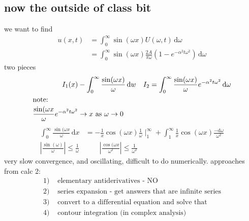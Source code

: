 \documentclass{article}
\begin{document}
\subsection*{now the outside of class bit}
we want to find
\begin{align*}
  u(x,t)&=\int_0^\infty{\sin(\omega x)U(\omega ,t)\,\mathrm{d}\omega }\\
  &=\int_0^\infty{\sin(\omega x)\frac{2A}{\pi \omega }\left(1-e^{-\alpha ^2t\omega ^2}\right)\,\mathrm{d}\omega }
\end{align*}
two pieces
\begin{align*}
  I_1(x)&-\int_0^\infty{\frac{\sin(\omega x)}{\omega }\,\mathrm{d}w}&I_2&=\int_0^\infty{\frac{\sin(\omega x)}{\omega }e^{-\alpha ^2t\omega ^2}\,\mathrm{d}\omega }\\
  \intertext{note:}
  \frac{\sin(\omega x}{\omega }e^{-\alpha ^2t\omega ^2}&\to x \text{ as } \omega \to0
\end{align*}
\begin{align*}
  \int_0^\infty{\frac{\sin(\omega x}{\omega }\,\mathrm{d}x}&=-\frac{1}{x}\cos(\omega x)\frac{1}{\omega }\mid_1^\infty{}+\int_1^\infty{\frac{1}{x}\cos(\omega x)\frac{-\mathrm{d}\omega }{\omega ^2}}\\
  \left\lvert\frac{\sin(\omega )}{\omega }\right\rvert\leq\frac{1}{\omega }&\qquad\left\lvert\frac{\cos(\omega x}{\omega ^2}\right\rvert\leq\frac{1}{\omega ^2}
\end{align*}
very slow convergence, and oscillating, difficult to do numerically. approaches from calc 2:
\begin{align*}
  1)&\text{ elementary antiderivatives - NO}\\
  2)&\text{ series expansion - get answers that are infinite series}\\
  3)&\text{ convert to a differential equation and solve that}\\
  4)&\text{ contour integration (in complex analysis)}
\end{align*}
\end{document}
